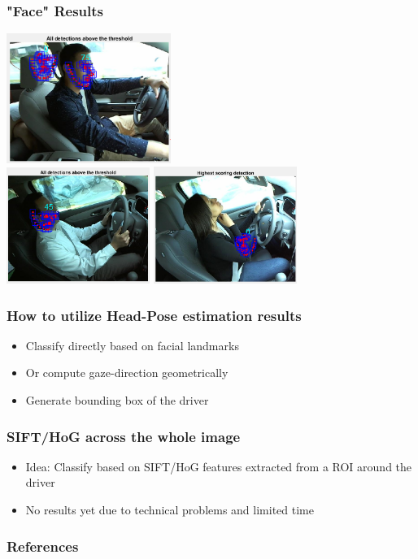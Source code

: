 \documentclass{beamer}
\begin{document}
	\begin{frame}
		\frametitle{"Face" Results}
		\begin{center}
			\includegraphics[width=0.4\textwidth]{faces/face3} \\ \vspace{0.1cm}
			\includegraphics[width=0.35\textwidth]{faces/face5} \hspace{0.1cm}
			\includegraphics[width=0.35\textwidth]{faces/face7}
		\end{center}		
	\end{frame}
	
	\begin{frame}
		\frametitle{How to utilize Head-Pose estimation results}
		\begin{itemize}
			\item Classify directly based on facial landmarks
			\item Or compute gaze-direction geometrically
			\item Generate bounding box of the driver
		\end{itemize}
	\end{frame}
	
	\begin{frame}
		\frametitle{SIFT/HoG across the whole image}
		
		\begin{itemize}
			\item Idea: Classify based on SIFT/HoG features extracted from a ROI around the driver
			\item No results yet due to technical problems and limited time
		\end{itemize}
	\end{frame}
	
	
    
	\begin{frame}[allowframebreaks]
		\frametitle{References} 
		\nocite{*} 
		 
		 
	\end{frame}
	
	\medskip

	
	
\end{document}
